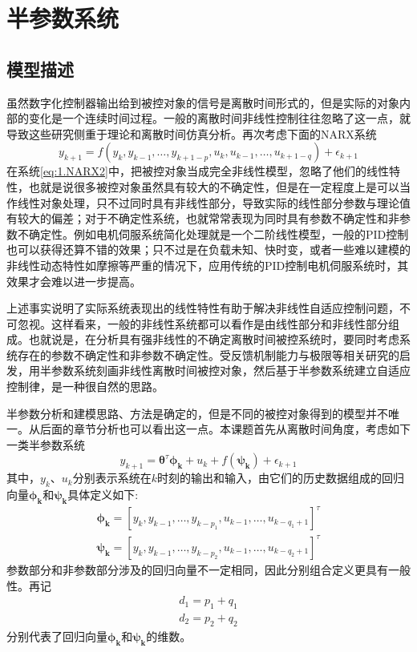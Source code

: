 \section{半参数系统}\label{sect:2.2}
\subsection{模型描述}\label{subsect:2.2.1}
虽然数字化控制器输出给到被控对象的信号是离散时间形式的，但是实际的对象内部的变化是一个连续时间过程。一般的离散时间非线性控制往往忽略了这一点，就导致这些研究侧重于理论和离散时间仿真分析。再次考虑下面的NARX系统
\begin{equation}%
\label{eq:1.NARX2}
y_{k+1} = f(y_{k},y_{k-1},\ldots,y_{k+1-p},u_{k},u_{k-1},\ldots,u_{k+1-q})+\epsilon_{k+1}
\end{equation}
在系统\eqref{eq:1.NARX2}中，把被控对象当成完全非线性模型，忽略了他们的线性特性，也就是说很多被控对象虽然具有较大的不确定性，但是在一定程度上是可以当作线性对象处理，只不过同时具有非线性部分，导致实际的线性部分参数与理论值有较大的偏差；对于不确定性系统，也就常常表现为同时具有参数不确定性和非参数不确定性。例如电机伺服系统简化处理就是一个二阶线性模型，一般的PID控制也可以获得还算不错的效果；只不过是在负载未知、快时变，或者一些难以建模的非线性动态特性如摩擦等严重的情况下，应用传统的PID控制电机伺服系统时，其效果才会难以进一步提高。

上述事实说明了实际系统表现出的线性特性有助于解决非线性自适应控制问题，不可忽视。这样看来，一般的非线性系统都可以看作是由线性部分和非线性部分组成。也就说是，在分析具有强非线性的不确定离散时间被控系统时，要同时考虑系统存在的参数不确定性和非参数不确定性。受反馈机制能力与极限等相关研究的启发，用半参数系统刻画非线性离散时间被控对象，然后基于半参数系统建立自适应控制律，是一种很自然的思路。

半参数分析和建模思路、方法是确定的，但是不同的被控对象得到的模型并不唯一。从后面的章节分析也可以看出这一点。本课题首先从离散时间角度，考虑如下一类半参数系统
\begin{equation}%
\label{eq:semi-u}
y_{k+1} = \bm{\theta}^{\tau}\bm{\phi_{k}}+u_{k}+f(\bm{\psi_{k}})+\epsilon_{k+1}
\end{equation}
其中，$y_{k}$、$u_{k}$分别表示系统在$k$时刻的输出和输入，由它们的历史数据组成的回归向量$\bm{\phi_{k}}$和$\bm{\psi_{k}}$具体定义如下:
\begin{eqnarray}
\bm{\phi_{k}}=[y_{k},y_{k-1},\ldots,y_{k-p_{1}},u_{k-1},\dots,u_{k-q_{1}+1}]^{\tau}\\
\bm{\psi_{k}}=[y_{k},y_{k-1},\ldots,y_{k-p_{2}},u_{k-1},\dots,u_{k-q_{2}+1}]^{\tau}
\end{eqnarray}
参数部分和非参数部分涉及的回归向量不一定相同，因此分别组合定义更具有一般性。再记
\begin{eqnarray}
d_{1}=p_{1}+q_{1}\\
d_{2}=p_{2}+q_{2}
\end{eqnarray}
分别代表了回归向量$\bm{\phi_{k}}$和$\bm{\psi_{k}}$的维数。

